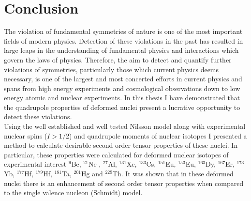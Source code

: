 \documentclass[10pt,a4paper, twoside, openright]{report}
\begin{document}
\chapter{Conclusion} \label{chap:P1Conc}
The violation of fundamental symmetries of nature is one of the most important fields of modern physics. Detection of these violations in the past has resulted in large leaps in the understanding of fundamental physics and interactions which govern the laws of physics. Therefore, the aim to detect and quantify further violations of symmetries, particularly those which current physics deems necessary, is one of the largest and most concerted efforts in current physics and spans from high energy experiments and cosmological observations down to low energy atomic and nuclear experiments. In this thesis I have demonstrated that the quadrupole properties of deformed nuclei present a lucrative opportunity to detect these violations.\\
\linebreak
Using the well established and well tested Nilsson model along with experimental nuclear spins ($I>1/2$) and quadrupole moments of nuclear isotopes I presented a method to calculate desirable second order tensor properties of these nuclei. In particular, these properties were calculated for deformed nuclear isotopes of experimental interest $^{9}$Be, $^{21}$Ne , $^{27}$Al, $^{131}$Xe, $^{133}$Cs, $^{151}$Eu, $^{153}$Eu, $^{163}$Dy, $^{167}$Er, $^{173}$Yb, $^{177}$Hf, $^{179}$Hf, $^{181}$Ta, $^{201}$Hg and $^{229}$Th. It was shown that in these deformed nuclei there is an enhancement of second order tensor properties when compared to the single valence nucleon (Schmidt) model.\\
\linebreak
\end{document}
